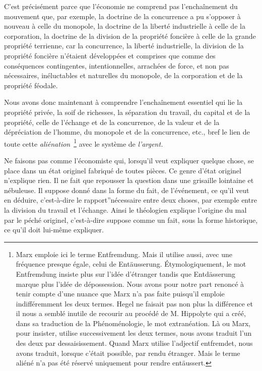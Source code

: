 \documentclass[french,twoside]{book} %
\begin{document}
C’est précisément parce que l’économie ne comprend pas l’enchaînement du mouvement que, par exemple, la doctrine de la concurrence a pu s’opposer à nouveau à celle du monopole, la doctrine de la liberté industrielle à celle de la corporation, la doctrine de la division de la propriété foncière à celle de la grande propriété terrienne, car la concurrence, la liberté industrielle, la division de la propriété foncière n’étaient développées et comprises que comme des conséquences contingentes, intentionnelles, arrachées de force, et non pas nécessaires, inéluctables et naturelles du monopole, de la corporation et de la propriété féodale.\par
Nous avons donc maintenant à comprendre l’enchaînement essentiel qui lie la propriété privée, la soif de richesses, la séparation du travail, du capital et de la propriété, celle de l’échange et de la concurrence, de la valeur et de la dépréciation de l’homme, du monopole et de la concurrence, etc., bref le lien de toute cette \emph{aliénation} \footnote{Marx emploie ici le terme Entfremdung. Mais il utilise aussi, avec une fréquence presque égale, celui de Entäusserung. Étymologiquement, le mot Entfremdung insiste plus sur l’idée d’étranger tandis que Entdässerung marque plus l’idée de dépossession. Nous avons pour notre part renoncé à tenir compte d’une nuance que Marx n’a pas faite puisqu’il emploie indifféremment les deux termes. Hegel ne faisait pas non plus la différence et il nous a semblé inutile de recourir au procédé de M. Hippolyte qui a créé, dans sa traduction de la Phénoménologie, le mot extranéation. Là ou Marx, pour insister, utilise successivement les deux termes, nous avons traduit l’un des deux par dessaisissement. Quand Marx utilise l’adjectif entfremdet, nous avons traduit, lorsque c’était possible, par rendu étranger. Mais le terme aliéné n’a pas été réservé uniquement pour rendre entäussert.} avec le système de \emph{l’argent.}\par
Ne faisons pas comme l’économiste qui, lorsqu’il veut expliquer quelque chose, se place dans un état originel fabriqué de toutes pièces. Ce genre d’état originel n’explique rien. Il ne fait que repousser la question dans une grisaille lointaine et nébuleuse. Il suppose donné dans la forme du fait, de l’événement, ce qu’il veut en déduire, c’est-à-dire le rapport”nécessaire entre deux choses, par exemple entre la division du travail et l’échange. Ainsi le théologien explique l’origine du mal par le péché originel, c’est-à-dire suppose comme un fait, sous la forme historique, ce qu’il doit lui-même expliquer.\par
\end{document}
